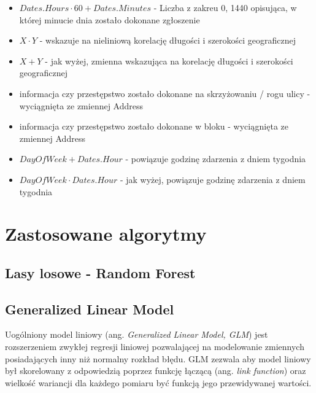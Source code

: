 \documentclass[11pt]{article} %
\begin{document}
\begin{itemize}
\item $Dates.Hours \cdot 60 + Dates.Minutes$ - Liczba z zakreu {0, 1440} opisująca, w której minucie dnia zostało dokonane zgłoszenie

\item $X \cdot Y$ - wskazuje na nieliniową korelację długości i szerokości geograficznej

\item $X + Y$ - jak wyżej, zmienna wskazująca na korelację długości i szerokości geograficznej

\item informacja czy przestępstwo zostało dokonane na skrzyżowaniu / rogu ulicy - wyciągnięta ze zmiennej Address

\item informacja czy przestępstwo zostało dokonane w bloku - wyciągnięta ze zmiennej Address

\item $DayOfWeek + Dates.Hour$  - powiązuje godzinę zdarzenia z dniem tygodnia

\item $DayOfWeek \cdot Dates.Hour$ -  jak wyżej, powiązuje godzinę zdarzenia z dniem tygodnia

\end{itemize}

\clearpage

\section{Zastosowane algorytmy}
\subsection{Lasy losowe - Random Forest}

\subsection{Generalized Linear Model}

Uogólniony model liniowy (ang. \textit{Generalized Linear Model, GLM}) jest rozszerzeniem zwykłej regresji liniowej pozwalającej na modelowanie zmiennych posiadających inny niż normalny rozkład błędu. GLM zezwala aby model liniowy był skorelowany z odpowiedzią poprzez funkcję łączącą (ang. \textit{link function}) oraz wielkość wariancji dla każdego pomiaru być funkcją jego przewidywanej wartości. \\
\end{document}

